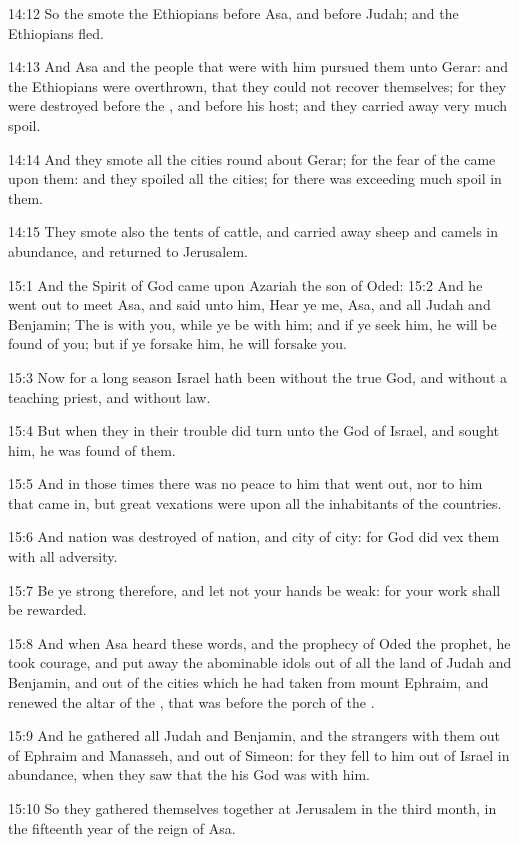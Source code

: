 14:12 So the \LORD smote the Ethiopians before Asa, and before Judah; and the Ethiopians fled.

14:13 And Asa and the people that were with him pursued them unto Gerar: and the Ethiopians were overthrown, that they could not recover themselves; for they were destroyed before the \LORD, and before his host; and they carried away very much spoil.

14:14 And they smote all the cities round about Gerar; for the fear of the \LORD came upon them: and they spoiled all the cities; for there was exceeding much spoil in them.

14:15 They smote also the tents of cattle, and carried away sheep and camels in abundance, and returned to Jerusalem.

15:1 And the Spirit of God came upon Azariah the son of Oded: 15:2 And he went out to meet Asa, and said unto him, Hear ye me, Asa, and all Judah and Benjamin; The \LORD is with you, while ye be with him; and if ye seek him, he will be found of you; but if ye forsake him, he will forsake you.

15:3 Now for a long season Israel hath been without the true God, and without a teaching priest, and without law.

15:4 But when they in their trouble did turn unto the \LORD God of Israel, and sought him, he was found of them.

15:5 And in those times there was no peace to him that went out, nor to him that came in, but great vexations were upon all the inhabitants of the countries.

15:6 And nation was destroyed of nation, and city of city: for God did vex them with all adversity.

15:7 Be ye strong therefore, and let not your hands be weak: for your work shall be rewarded.

15:8 And when Asa heard these words, and the prophecy of Oded the prophet, he took courage, and put away the abominable idols out of all the land of Judah and Benjamin, and out of the cities which he had taken from mount Ephraim, and renewed the altar of the \LORD, that was before the porch of the \LORD.

15:9 And he gathered all Judah and Benjamin, and the strangers with them out of Ephraim and Manasseh, and out of Simeon: for they fell to him out of Israel in abundance, when they saw that the \LORD his God was with him.

15:10 So they gathered themselves together at Jerusalem in the third month, in the fifteenth year of the reign of Asa.

